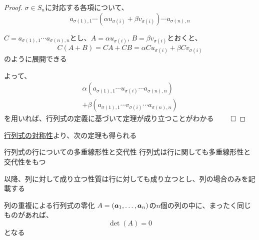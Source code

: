 \documentclass[../../../topic_linear-algebra]{subfiles}
\begin{document}
\begin{proof}
  $\sigma \in S_n$に対応する各項について、
  \begin{equation*}
    a_{\sigma(1),1} \cdots (\alpha u_{\sigma(i)} + \beta v_{\sigma(i)}) \cdots a_{\sigma(n),n}
  \end{equation*}

  $C = a_{\sigma(1),1} \cdots a_{\sigma(n),n}$とし、$A = \alpha u_{\sigma(i)}, \, B = \beta v_{\sigma(i)}$とおくと、
  \begin{equation*}
    C(A + B) = CA + CB = \alpha C u_{\sigma(i)} + \beta C v_{\sigma(i)}
  \end{equation*}
  のように展開できる

  よって、
  \begin{multline*}
    \alpha (a_{\sigma(1),1} \cdots u_{\sigma(i)} \cdots a_{\sigma(n),n}) \\
    + \beta(a_{\sigma(1),1} \cdots v_{\sigma(i)} \cdots a_{\sigma(n),n})
  \end{multline*}
  を用いれば、行列式の定義に基づいて定理が成り立つことがわかる $\qed$
\end{proof}

\sectionline

\hyperref[thm:determinant-transpose-invariance]{行列式の対称性}より、次の定理も得られる

\begin{theorem}{行列式の行についての多重線形性と交代性}
  行列式は行に関しても多重線形性と交代性をもつ
\end{theorem}

以降、列に対して成り立つ性質は行に対しても成り立つとし、列の場合のみを記載する

\sectionline

\begin{theorem}{列の重複による行列式の零化}\label{thm:det-zero-if-columns-repeat}
  $A = (\vb*{a}_1, \ldots, \vb*{a}_n)$の$n$個の列の中に、まったく同じものがあれば、
  \begin{equation*}
    \det(A) = 0
  \end{equation*}
  となる
\end{theorem}
\end{document}

